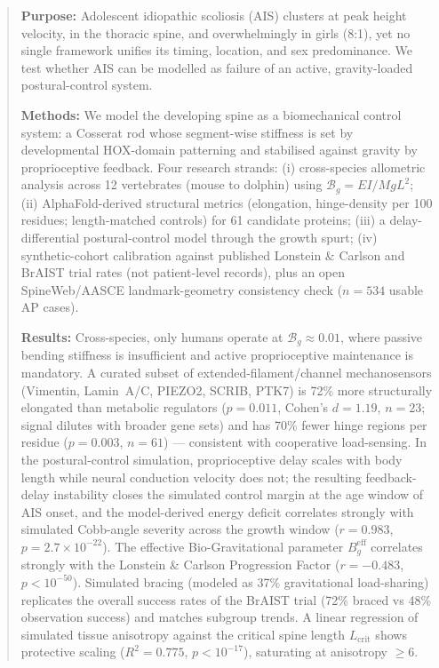 \begin{abstract}
\noindent\textbf{Purpose:} Adolescent idiopathic scoliosis (AIS) clusters at peak height velocity, in the thoracic spine, and overwhelmingly in girls (8:1), yet no single framework unifies its timing, location, and sex predominance. We test whether AIS can be modelled as failure of an active, gravity-loaded postural-control system.

\noindent\textbf{Methods:} We model the developing spine as a biomechanical control system: a Cosserat rod whose segment-wise stiffness is set by developmental HOX-domain patterning and stabilised against gravity by proprioceptive feedback. Four research strands: (i) cross-species allometric analysis across 12 vertebrates (mouse to dolphin) using $\mathcal{B}_g = EI/MgL^2$; (ii) AlphaFold-derived structural metrics (elongation, hinge-density per 100 residues; length-matched controls) for 61 candidate proteins; (iii) a delay-differential postural-control model through the growth spurt; (iv) synthetic-cohort calibration against published Lonstein \& Carlson and BrAIST trial rates (not patient-level records), plus an open SpineWeb/AASCE landmark-geometry consistency check ($n=534$ usable AP cases).

\noindent\textbf{Results:} Cross-species, only humans operate at $\mathcal{B}_g \approx 0.01$, where passive bending stiffness is insufficient and active proprioceptive maintenance is mandatory. A curated subset of extended-filament/channel mechanosensors (Vimentin, Lamin~A/C, PIEZO2, SCRIB, PTK7) is 72\% more structurally elongated than metabolic regulators ($p=0.011$, Cohen's $d=1.19$, $n=23$; signal dilutes with broader gene sets) and has 70\% fewer hinge regions per residue ($p=0.003$, $n=61$) --- consistent with cooperative load-sensing. In the postural-control simulation, proprioceptive delay scales with body length while neural conduction velocity does not; the resulting feedback-delay instability closes the simulated control margin at the age window of AIS onset, and the model-derived energy deficit correlates strongly with simulated Cobb-angle severity across the growth window ($r=0.983$, $p=2.7\times 10^{-22}$). The effective Bio-Gravitational parameter $B_g^{\mathrm{eff}}$ correlates strongly with the Lonstein \& Carlson Progression Factor ($r = -0.483$, $p < 10^{-50}$). Simulated bracing (modeled as 37\% gravitational load-sharing) replicates the overall success rates of the BrAIST trial (72\% braced vs 48\% observation success) and matches subgroup trends. A linear regression of simulated tissue anisotropy against the critical spine length $L_{\mathrm{crit}}$ shows protective scaling ($R^2=0.775$, $p<10^{-17}$), saturating at anisotropy $\geq 6$.


\end{abstract}
